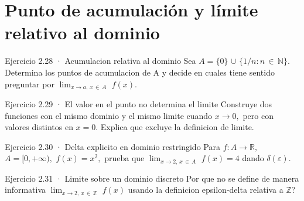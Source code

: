 \documentclass[10pt,a4paper,oneside,openany]{book}
\begin{document}
\section{Punto de acumulación y límite relativo al dominio}
\begin{PSevenExerciseFixed}{Ejercicio 2.28 · Acumulacion relativa al dominio}
Sea \(A=\{0\}\) \(\cup \) \(\{1/n:n\,\in \,\mathbb{N}\}\). Determina los puntos de acumulacion de A y decide en cuales tiene sentido preguntar por \(\lim_{x\to a,\,x\,\in \,A}\) \(f(x)\).
\end{PSevenExerciseFixed}
\begin{PSevenExerciseFixed}{Ejercicio 2.29 · El valor en el punto no determina el limite}
Construye dos funciones con el mismo dominio y el mismo limite cuando \(x\to 0,\) pero con valores distintos en \(x=0\). Explica que excluye la definicion de limite.
\end{PSevenExerciseFixed}
\begin{PSevenExerciseFixed}{Ejercicio 2.30 · Delta explicito en dominio restringido}
Para \(f:A\to \mathbb{R},\) \(A=[0,+\infty ),\) \(f(x)=x^{2},\) prueba que \(\lim_{x\to 2,\,x\,\in \,A}\) \(f(x)=4\) dando \(\delta (\varepsilon )\).
\end{PSevenExerciseFixed}
\begin{PSevenExerciseFixed}{Ejercicio 2.31 · Limite sobre un dominio discreto}
Por que no se define de manera informativa \(\lim_{x\to 2,\,x\,\in \,\mathbb{Z}}\) \(f(x)\) usando la definicion epsilon-delta relativa a \(\mathbb{Z}\)?
\end{PSevenExerciseFixed}
\end{document}
